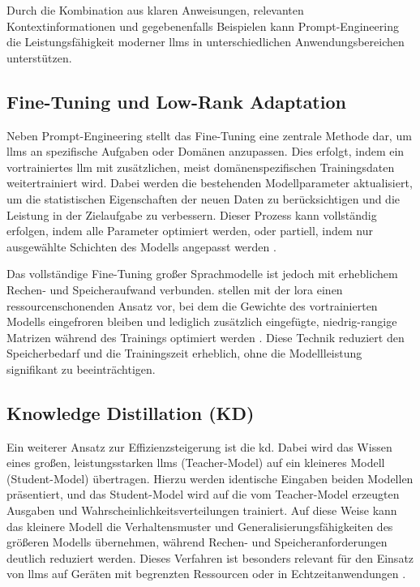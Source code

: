 Durch die Kombination aus klaren Anweisungen, relevanten Kontextinformationen und gegebenenfalls Beispielen kann Prompt-Engineering die Leistungsfähigkeit moderner \glspl{llm} in unterschiedlichen Anwendungsbereichen unterstützen.


\subsection{Fine-Tuning und Low-Rank Adaptation}

Neben Prompt-Engineering stellt das Fine-Tuning eine zentrale Methode dar, um \glspl{llm} an spezifische Aufgaben oder Domänen anzupassen.
Dies erfolgt, indem ein vortrainiertes \gls{llm} mit zusätzlichen, meist domänenspezifischen Trainingsdaten weitertrainiert wird.
Dabei werden die bestehenden Modellparameter aktualisiert, um die statistischen Eigenschaften der neuen Daten zu berücksichtigen und die Leistung in der Zielaufgabe zu verbessern.
Dieser Prozess kann vollständig erfolgen, indem alle Parameter optimiert werden, oder partiell, indem nur ausgewählte Schichten des Modells angepasst werden \autocite{hu_lora_2021}.

Das vollständige Fine-Tuning großer Sprachmodelle ist jedoch mit erheblichem Rechen- und Speicheraufwand verbunden.
\citeauthor{hu_lora_2021} stellen mit der \gls{lora} einen ressourcenschonenden Ansatz vor, bei dem die Gewichte des vortrainierten Modells eingefroren bleiben und lediglich zusätzlich eingefügte, niedrig-rangige Matrizen während des Trainings optimiert werden \autocite{hu_lora_2021}.
Diese Technik reduziert den Speicherbedarf und die Trainingszeit erheblich, ohne die Modellleistung signifikant zu beeinträchtigen.


\subsection{Knowledge Distillation (KD)}

Ein weiterer Ansatz zur Effizienzsteigerung ist die \gls{kd}.
Dabei wird das Wissen eines großen, leistungsstarken \glspl{llm} (Teacher-Model) auf ein kleineres Modell (Student-Model) übertragen.
Hierzu werden identische Eingaben beiden Modellen präsentiert, und das Student-Model wird auf die vom Teacher-Model erzeugten Ausgaben und Wahrscheinlichkeitsverteilungen trainiert.
Auf diese Weise kann das kleinere Modell die Verhaltensmuster und Generalisierungsfähigkeiten des größeren Modells übernehmen, während Rechen- und Speicheranforderungen deutlich reduziert werden.
Dieses Verfahren ist besonders relevant für den Einsatz von \glspl{llm} auf Geräten mit begrenzten Ressourcen oder in Echtzeitanwendungen \autocite{xu_survey_2024}.

